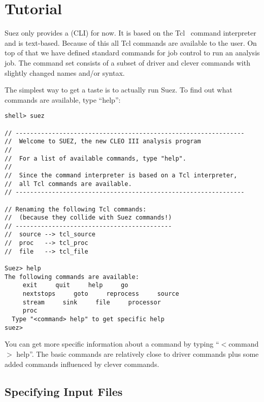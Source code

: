 \documentclass[12pt]{article}
\begin{document}
\section{Tutorial}
\label{sec:Tutorial}

Suez only provides a  (CLI) for now. It is
based on the Tcl~\cite{TclInfo} command interpreter and is
text-based. Because of this all Tcl commands are available to the user.
On top of that we have defined standard commands for job control to run
an analysis job. The command set consists of a subset of driver and
clever commands with slightly changed names and/or syntax.

The simplest way to get a taste is to actually run Suez. To find out
what commands are available, type ``help'':
%
\begin{verbatim}
shell> suez

// ---------------------------------------------------------------
//  Welcome to SUEZ, the new CLEO III analysis program            
//                                                                
//  For a list of available commands, type "help".              
//                                                                
//  Since the command interpreter is based on a Tcl interpreter,  
//  all Tcl commands are available.                               
// ---------------------------------------------------------------

// Renaming the following Tcl commands:
//  (because they collide with Suez commands!)
// -------------------------------------------
//  source --> tcl_source
//  proc   --> tcl_proc
//  file   --> tcl_file

Suez> help
The following commands are available:
     exit     quit     help     go
     nextstops     goto     reprocess     source
     stream     sink     file     processor
     proc
  Type "<command> help" to get specific help
suez> 
\end{verbatim}

You can get more specific information about a command by
typing ``$<$command$>$ help''. The basic commands are relatively close to
driver commands plus some added commands influenced by clever commands.


\subsection{Specifying Input Files}
\label{sec:tutorial-file}
\end{document}
